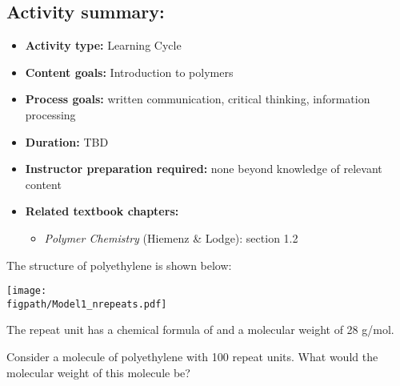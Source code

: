 \begin{activity}
\begin{instructornotes}
	\subsection*{Activity summary:}
	\begin{itemize}
		\item \textbf{Activity type:} Learning Cycle
		\item \textbf{Content goals:} Introduction to polymers
		\item \textbf{Process goals:} %
			written communication, critical thinking, information processing
		\item \textbf{Duration:} TBD
		\item \textbf{Instructor preparation required:} none beyond knowledge of relevant content
		\item \textbf{Related textbook chapters:}
			\begin{itemize}
				\item \emph{Polymer Chemistry} (Hiemenz \& Lodge): section 1.2
			\end{itemize}
	\end{itemize}
	
\end{instructornotes}




\begin{model}
\label{\labelbase:mdl:polyethyleneMW}

	The structure of polyethylene is shown below:

	\vspace{6pt}
	\centerline{\texttt{[image: \\figpath/Model1\_nrepeats.pdf]}}
	\vspace{6pt}
	
	The repeat unit has a chemical formula of  and a molecular weight of 28 g/mol.

\end{model}


\begin{ctqs}

	\question Consider a molecule of polyethylene with 100 repeat units.  What would the molecular weight of this molecule be?
			

\end{ctqs}
\end{activity}
